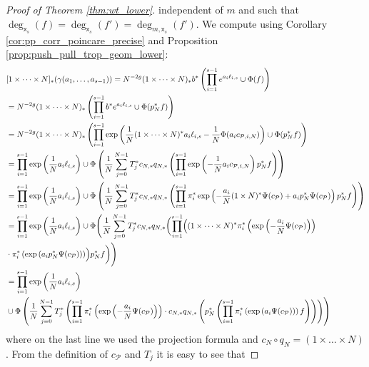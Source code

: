 \documentclass[11pt]{article}
\theoremstyle{definition}
\begin{document}
\begin{proof}[Proof of Theorem \ref{thm:wt_lower}]
	independent of $m$ and such that $\deg_{\mathsf{x}_s}(f)=\deg_{\mathsf{x}_s}(f')=\deg_{m,\mathsf{x}_s}(f')$.
	We compute using Corollary \ref{cor:pp_corr_poincare_precise}
	and Proposition \ref{prop:push_pull_trop_geom_lower}:
	{\allowdisplaybreaks\begin{align*}
			&[1\times\dots\times N]_{\ast}(\gamma(a_1,\dots,a_{s-1}))=N^{-2g}(1\times\dots\times N)_{\ast}b^{\ast}\left(\prod_{i=1}^{s-1}e^{a_i\ell_{i,s}}\cup\Phi(f)\right)\\
			&=N^{-2g}(1\times\dots\times N)_{\ast}\left(\prod_{i=1}^{s-1}b^{\ast}e^{a_i\ell_{i,s}}\cup \Phi(p_N^{\ast}f)\right)\\
			&=N^{-2g}(1\times\dots\times N)_{\ast}\left(\prod_{i=1}^{s-1}\exp\left(\frac{1}{N}(1\times \dots\times N)^{\ast}a_i\ell_{i,s}-\frac{1}{N}\Phi(a_ic_{\mathcal P,i,N})\right)\cup\Phi(p_N^{\ast}f)\right)\\
			&=\prod_{i=1}^{s-1}\exp\left(\frac{1}{N}a_i\ell_{i,s}\right)\cup\Phi\left(\frac{1}{N}\sum_{j=0}^{N-1}T_j ^{\ast}c_{N,\ast}q_{N,\ast}\left(\prod_{i=1}^{s-1}\exp\left(-\frac{1}{N}a_ic_{\mathcal P,i,N}\right)p_N^{\ast}f\right)\right)\\
			&=\prod_{i=1}^{s-1}\exp\left(\frac{1}{N}a_i\ell_{i,s}\right)\cup\Phi\left(\frac{1}{N}\sum_{j=0}^{N-1}T_j ^{\ast}c_{N,\ast}q_{N,\ast}\left(\prod_{i=1}^{s-1}\pi_i^{\ast}\exp\left(-\frac{a_i}{N}(1\times N)^{\ast}\Psi(c_{\mathcal P})+a_ip_N^{\ast}\Psi(c_{\mathcal P})\right)p_N^{\ast}f\right)\right)\\
			&=\prod_{i=1}^{s-1}\exp\left(\frac{1}{N}a_i\ell_{i,s}\right)\cup\Phi\Biggl(\frac{1}{N}\sum_{j=0}^{N-1}T_j ^{\ast}c_{N,\ast}q_{N,\ast}\biggl(\prod_{i=1}^{s-1}\Bigl((1\times\dots\times N)^{\ast}\pi_i^{\ast}\left(\exp\left(-\frac{a_i}{N}\Psi(c_{\mathcal P})\right)\right)\\
			&\cdot\pi_i^{\ast}\left(\exp\left(a_ip_N^{\ast}\Psi(c_{\mathcal P})\right)\right)\Bigr)p_N^{\ast}f\biggr)\Biggr)\\
			&=\prod_{i=1}^{s-1}\exp\left(\frac{1}{N}a_i\ell_{i,s}\right)\\
			&\cup \Phi\left(\frac{1}{N}\sum_{j=0}^{N-1}T_j ^{\ast}\left(\prod_{i=1}^{s-1}\pi_i^{\ast}\left(\exp\left(-\frac{a_i}{N}\Psi(c_{\mathcal P})\right)\right)\cdot c_{N,\ast}q_{N,\ast}\left(p_N^{\ast}\left(\prod_{i=1}^{s-1}\pi_i^{\ast}\left(\exp\left(a_i\Psi(c_{\mathcal P})\right)\right)f\right)\right)\right)\right)
	\end{align*}}
	where on the last line we used the projection formula and $c_{N}\circ q_N=(1\times\dots\times N)$.
	From the definition of $c_{\mathcal P}$ and $T_j$ it is easy to see that

\end{proof}
\end{document}
